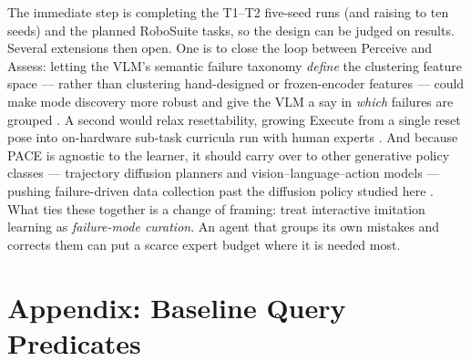 \documentclass[letterpaper]{article} %
\begin{document}
The immediate step is completing the T1--T2 five-seed runs (and raising to ten
seeds) and the planned RoboSuite tasks, so the design can be judged on results.
Several extensions then open. One is to close the loop between Perceive and
Assess: letting the VLM's semantic failure taxonomy \emph{define} the clustering
feature space --- rather than clustering hand-designed or frozen-encoder features
--- could make mode discovery more robust and give the VLM a say in \emph{which}
failures are grouped
\cite{liu2023reflect,duan2025aha,ash2020badge,sener2018coreset,settles2009active}.
A second would relax resettability, growing Execute from a single
reset pose into on-hardware sub-task curricula run with human experts
\cite{kelly2019hgdagger,liu2023sirius}. And because
PACE is agnostic to the learner, it should carry over to other generative policy
classes --- trajectory diffusion planners \cite{janner2022diffuser} and
vision--language--action models \cite{brohan2023rt2,driess2023palme} --- pushing
failure-driven data collection past the diffusion policy studied here
\cite{chi2023diffusionpolicy}. What ties these together is a change of
framing: treat interactive imitation learning as \emph{failure-mode curation}. An
agent that groups its own mistakes and corrects them can put a scarce expert
budget where it is needed most.

\appendix
\section{Appendix: Baseline Query Predicates}
\label{app:baselines}
\end{document}
